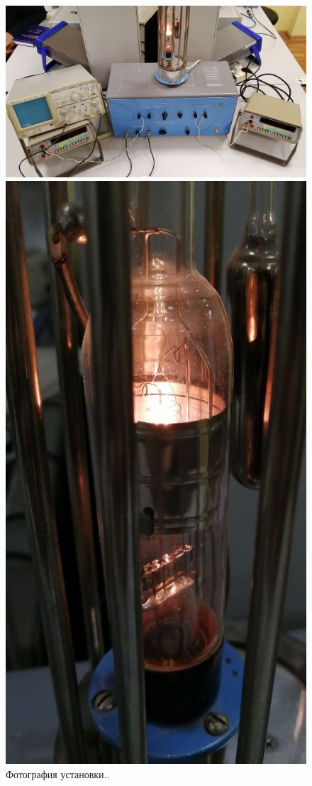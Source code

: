 \documentclass[12pt,a4paper]{article}
\begin{document}
	\begin{figure}[H]
		\centering
		\begin{minipage}{0.75\textwidth}
			\centering
			\includegraphics[width=0.9\linewidth]{photos/setup.jpg}
		\end{minipage}%
		\begin{minipage}{0.24\textwidth}
			\centering
			\includegraphics[width=0.9\linewidth]{photos/lamp.jpg}
		\end{minipage}
		\caption{Фотография установки..}
		\label{fig:setup}
	\end{figure}
\end{document}
